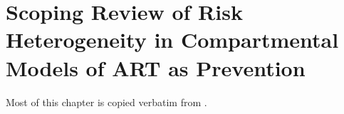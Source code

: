 \chapter{Scoping Review of Risk Heterogeneity in Compartmental Models of ART as Prevention}\label{sr}
Most of this chapter is copied verbatim from \cite{Knight2022sr}.




\printchapterbibliography
